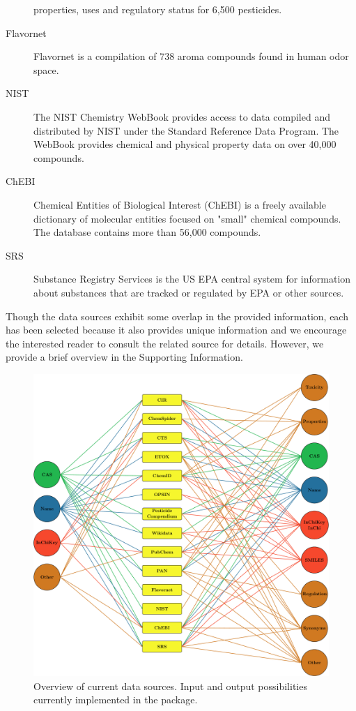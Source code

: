\documentclass[article]{jss}
\begin{document}
\begin{description}
{	properties, uses and regulatory status for 6,500 pesticides.}
\item[Flavornet]{\citep{flavornet} Flavornet is a compilation of 738 aroma compounds found in human odor space.}
\item[NIST]{\citep{nist} The NIST Chemistry WebBook provides access to data compiled and distributed by NIST under the Standard Reference Data Program. The WebBook provides chemical and physical property data on over 40,000 compounds.}
\item[ChEBI]{\citep{chebi} Chemical Entities of Biological Interest (ChEBI) is a freely available dictionary of molecular entities focused on "small" chemical compounds. The database contains more than 56,000 compounds.}
\item[SRS]{\citep{srs} Substance Registry Services is the US EPA central system for information about substances that are tracked or regulated by EPA or other sources.}

\end{description}

Though the data sources exhibit some overlap in the provided
information, each has been selected because it also provides unique
information and we encourage the interested reader to consult the
related source for details.  However, we provide a brief overview in
the Supporting Information.

\begin{figure}[t!]
  \centering
  \includegraphics{fig1}
  \caption{Overview of current data sources. Input and output possibilities currently implemented in the package.}
  \label{fig:fig1}
\end{figure}
\end{document}
